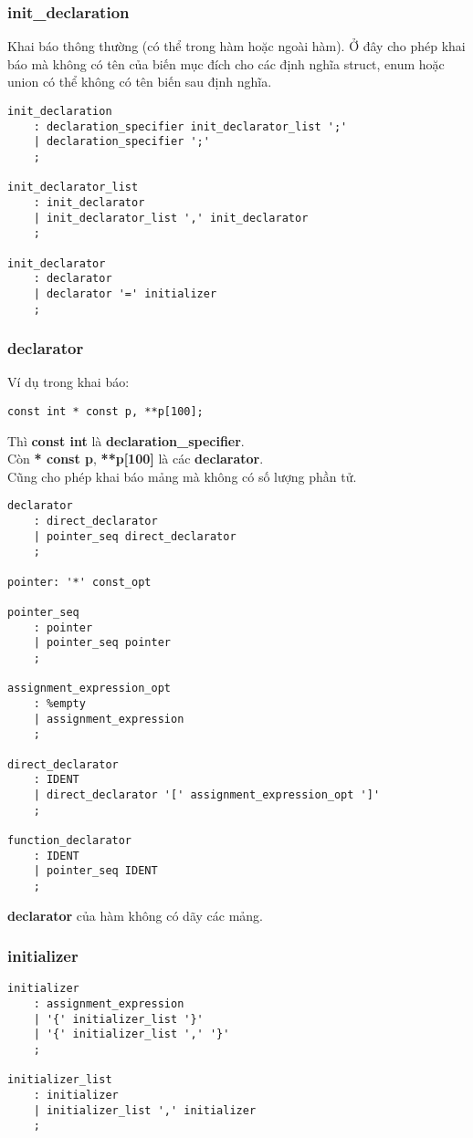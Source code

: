 \documentclass[../report.tex]{subfiles}
\begin{document}
\subsubsection{init\_declaration}
Khai báo thông thường (có thể trong hàm hoặc ngoài hàm). 
Ở đây cho phép khai báo mà không có tên của biến 
mục đích cho các định nghĩa struct, enum hoặc union có thể 
không có tên biến sau định nghĩa. 
\begin{lstlisting}
init_declaration
    : declaration_specifier init_declarator_list ';'
    | declaration_specifier ';'
    ;

init_declarator_list 
    : init_declarator
    | init_declarator_list ',' init_declarator 
    ;

init_declarator 
    : declarator 
    | declarator '=' initializer
    ;
\end{lstlisting}

\subsubsection{declarator}
Ví dụ trong khai báo: 
\begin{lstlisting}
const int * const p, **p[100];
\end{lstlisting}
Thì \textbf{const int} là \textbf{declaration\_specifier}. \\ 
Còn \textbf{* const p}, 
\textbf{**p[100]} là các \textbf{declarator}. \\
Cũng cho phép khai báo mảng mà không có số lượng phần tử. 

\begin{lstlisting}
declarator
    : direct_declarator 
    | pointer_seq direct_declarator
    ;

pointer: '*' const_opt

pointer_seq
    : pointer
    | pointer_seq pointer
    ;

assignment_expression_opt
    : %empty
    | assignment_expression
    ;

direct_declarator
    : IDENT
    | direct_declarator '[' assignment_expression_opt ']'
    ;

function_declarator
    : IDENT
    | pointer_seq IDENT
    ;
\end{lstlisting}
\textbf{declarator} của hàm không có dãy các mảng. 

\subsubsection{initializer}
\begin{lstlisting}
initializer
    : assignment_expression
    | '{' initializer_list '}'
    | '{' initializer_list ',' '}'
    ;

initializer_list
    : initializer
    | initializer_list ',' initializer
    ;
\end{lstlisting}
\end{document}
